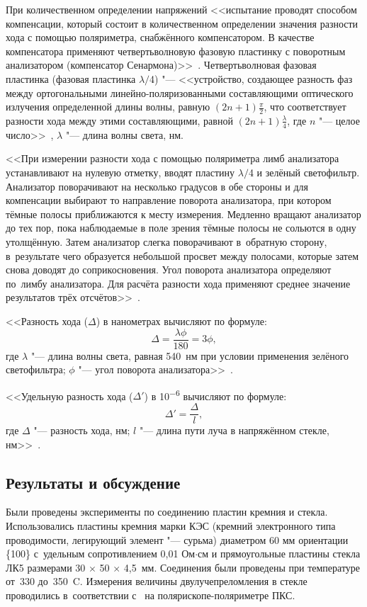 При количественном определении напряжений <<испытание проводят способом
компенсации, который состоит в количественном определении значения разности хода
с помощью поляриметра, снабжённого компенсатором. В качестве компенсатора
применяют четвертьволновую фазовую пластинку с поворотным анализатором (компенсатор
Сенармона)>>~\cite{gost_metod_opred_dvulucheprelom}.
Четвертьволновая фазовая пластинка (фазовая пластинка $\lambda/$4) "---
<<устройство, создающее разность фаз между ортогональными линейно-поляризованными
составляющими оптического излучения определенной длины волны, равную
\((2n+1)\frac{\pi}{2}\), что соответствует разности хода между этими
составляющими, равной \((2n+1)\frac{\lambda}{4}\),
где \( n \) "--- целое число>>~\cite{gost_metod_opred_dvulucheprelom},
\( \lambda \) "--- длина волны света, нм.

<<При измерении разности хода с помощью поляриметра лимб анализатора устанавливают
на нулевую отметку, вводят пластину $\lambda/$4 и зелёный светофильтр.
Анализатор поворачивают на несколько градусов в обе стороны и для компенсации
выбирают то направление поворота анализатора, при котором тёмные полосы
приближаются к месту измерения. Медленно вращают анализатор до тех пор, пока
наблюдаемые в поле зрения тёмные полосы не сольются в одну утолщённую. Затем
анализатор слегка поворачивают в~обратную сторону, в~результате чего образуется
небольшой просвет между полосами, которые затем снова доводят до
соприкосновения. Угол поворота анализатора определяют по~лимбу анализатора. Для
расчёта разности хода применяют среднее значение результатов трёх
отсчётов>>~\cite{gost_metod_opred_dvulucheprelom}.

<<Разность хода ($\Delta$) в нанометрах вычисляют по формуле:
\begin{equation*}
    \Delta =\frac{\lambda \phi }{180}=3\phi,
\end{equation*}
где $\lambda$ "--- длина волны света, равная 540~нм при условии применения зелёного светофильтра;
$\phi$ "--- угол поворота анализатора>>~\cite{gost_metod_opred_dvulucheprelom}.

<<Удельную разность хода ($\Delta'$) в
10\textsuperscript{$-$6}
вычисляют по формуле:
\begin{equation*}
    \Delta'=\frac{\Delta}{l},
\end{equation*}
где $\Delta $ "--- разность хода, нм;
$ l $ "--- длина пути луча в напряжённом стекле, нм>>~\cite{gost_metod_opred_dvulucheprelom}.

\subsection{Результаты и обсуждение}
Были проведены эксперименты по соединению пластин кремния и стекла.
Использовались пластины кремния марки КЭС (кремний электронного типа проводимости, легирующий элемент "--- сурьма)
диаметром 60 мм ориентации \{100\} с~удельным сопротивлением 0,01 Ом$\cdot$см и прямоугольные пластины стекла ЛК5
размерами 30\(\,\times\,\)50\(\,\times\,\)4,5~мм. Соединения были проведены при
температуре от~330 до~350~{\textdegree}C. Измерения величины двулучепреломления в
стекле проводились в~соответствии с~\cite{gost_metod_opred_dvulucheprelom} на
полярископе\nb-поляриметре ПКС.

